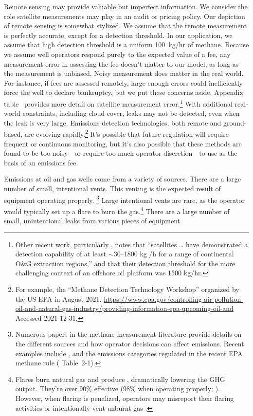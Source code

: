 Remote sensing may provide valuable but imperfect information.
We consider the role satellite measurements may play in an audit or pricing policy.
Our depiction of remote sensing is somewhat stylized.
We assume that the remote measurement is perfectly accurate, except for a detection threshold.
In our application, we assume that high detection threshold is a uniform 100~kg/hr of methane.
Because we assume well operators respond purely to the expected value of a fee, any  measurement error in assessing the fee doesn't matter to our model, as long as the measurement is unbiased.
Noisy measurement does matter in the real world.
For instance, if fees are assessed remotely, large enough errors could inefficiently force the well to declare bankruptcy, but we put these concerns aside.
Appendix table~\iftoggle{usexr}{\ref{tab:satellite-detection-threshold}}{A1} provides more detail on satellite measurement error.\footnote{%
Other recent work, particularly
\textcite{IrakulisLoitxate/Gorrono/ZavalaAraiza/Guanter:2022},
notes that ``satellites \ldots{} have demonstrated a detection capability of at least \(\sim\)30--1800 kg /h for a range of continental O\&G extraction regions,'' and that their detection threshold for the more challenging context of an offshore oil platform was 1500 kg/hr.
}
With additional real-world constraints, including cloud cover, leaks may not be detected, even when the leak is very large.
Emissions detection technologies, both remote and ground-based, are evolving rapidly.\footnote{%
For example, the ``Methane Detection Technology Workshop'' organized by the US EPA in August 2021. \hspace{0em plus 0.1em}
\url{https://www.epa.gov/controlling-air-pollution-oil-and-natural-gas-industry/providing-information-epa-upcoming-oil-and}
Accessed 2021-12-31.
}
It's possible that future regulation will require frequent or continuous monitoring, but it's also possible that these methods are found to be too noisy---or require too much operator discretion---to use as the basis of an emissions fee.

Emissions at oil and gas wells come from a variety of sources.
There are a large number of small, intentional vents.
This venting is the expected result of equipment operating properly.%
\footnote{%
Numerous papers in the methane measurement literature provide details on the different sources and how operator decisions can affect emissions.
Recent examples include \textcite{Wang/Barlow/Funk/Robinson/Brandt/Ravikumar:2021}, and the emissions categories regulated in the recent EPA methane rule (\cite{EPA-methane-rule-RIA-2023} Table~2-1).
}
Large intentional vents are rare, as the operator would typically set up a flare to burn the gas.\footnote{%
Flares burn natural gas and produce , dramatically lowering the \gls{GHG} output.
They're over 90\% effective (98\% when operating properly; \cite{Plant/etal:2022}).
However, when flaring is penalized, operators may misreport their flaring activities
\parencite{Lau:2021}
or intentionally vent unburnt gas
\parencite{Calel/Mahdavi:2020}.
}
There are a large number of small, unintentional leaks from various pieces of equipment.

